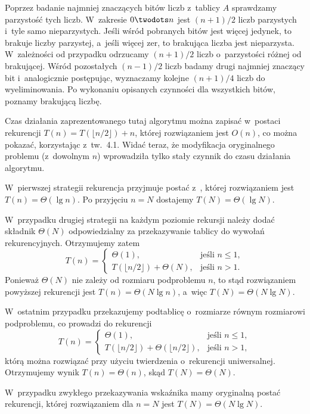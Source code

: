 Poprzez badanie najmniej znaczących bitów liczb z~tablicy $A$ sprawdzamy parzystość tych liczb. W~zakresie $0\twodots n$ jest $(n+1)/2$ liczb parzystych i~tyle samo nieparzystych. Jeśli wśród pobranych bitów jest więcej jedynek, to brakuje liczby parzystej, a~jeśli więcej zer, to brakująca liczba jest nieparzysta. W~zależności od przypadku odrzucamy $(n+1)/2$ liczb o~parzystości różnej od brakującej. Wśród pozostałych $(n-1)/2$ liczb badamy drugi najmniej znaczący bit i~analogicznie postępując, wyznaczamy kolejne $(n+1)/4$ liczb do wyeliminowania. Po wykonaniu opisanych czynności dla wszystkich bitów, poznamy brakującą liczbę.

Czas działania zaprezentowanego tutaj algorytmu można zapisać w~postaci rekurencji $T(n)=T(\lfloor n/2\rfloor)+n$, której rozwiązaniem jest $O(n)$, co można pokazać, korzystając z~tw.~4.1. Widać teraz, że modyfikacja oryginalnego problemu (z~dowolnym $n$) wprowadziła tylko stały czynnik do czasu działania algorytmu.


\subproblem %
W~pierwszej strategii rekurencja przyjmuje postać z~, której rozwiązaniem jest $T(n)=\Theta(\lg n)$. Po przyjęciu $n=N$ dostajemy $T(N)=\Theta(\lg N)$.

W~przypadku drugiej strategii na każdym poziomie rekursji należy dodać składnik $\Theta(N)$ odpowiedzialny za przekazywanie tablicy do wywołań rekurencyjnych. Otrzymujemy zatem
\[
	T(n) = \begin{cases}
		\Theta(1), & \text{jeśli $n\le1$}, \\
		T(\lfloor n/2\rfloor)+\Theta(N), & \text{jeśli $n>1$}.
	\end{cases}
\]
Ponieważ $\Theta(N)$ nie zależy od rozmiaru podproblemu $n$, to stąd rozwiązaniem powyższej rekurencji jest $T(n)=\Theta(N\lg n)$, a~więc $T(N)=\Theta(N\lg N)$.

W~ostatnim przypadku przekazujemy podtablicę o~rozmiarze równym rozmiarowi podproblemu, co prowadzi do rekurencji
\[
	T(n) = \begin{cases}
		\Theta(1), & \text{jeśli $n\le1$}, \\
		T(\lfloor n/2\rfloor)+\Theta(\lfloor n/2\rfloor), & \text{jeśli $n>1$},
	\end{cases}
\]
którą można rozwiązać przy użyciu twierdzenia o~rekurencji uniwersalnej. Otrzymujemy wynik $T(n)=\Theta(n)$, skąd $T(N)=\Theta(N)$.

\subproblem %
W~przypadku zwykłego przekazywania wskaźnika mamy oryginalną postać rekurencji, której rozwiązaniem dla $n=N$ jest $T(N)=\Theta(N\lg N)$.


